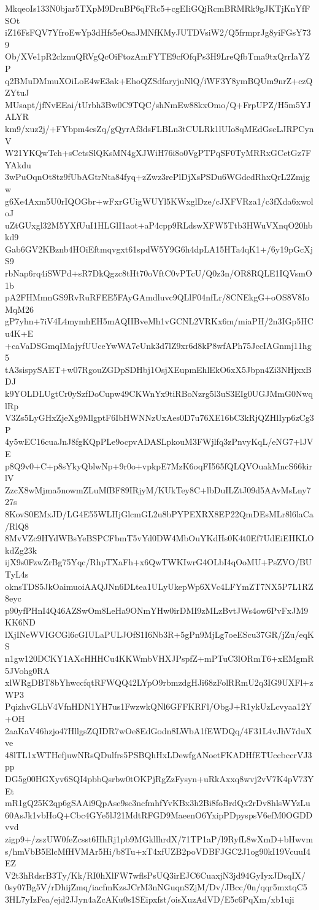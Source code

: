 MkqeoIs133N0bjar5TXpM9DruBP6qFRc5+cgEIiGQjRcmBRMRk9gJKTjKnYfFSOt
iZ16FsFQV7YfroEwYp3dHfs5eOsaJMNfKMyJUTDVsiW2/Q5frmprJg8yiFGsY739
Ob/XVe1pR2clznuQRVgQcOiFtozAmFYTE9cfOfqPs3H9LreQfbTma9txQrrIaYZP
q2BMuDMmuXOiLoE4wE3ak+EhoQZSdfaryjuNlQ/iWF3Y8ymBQUm9nrZ+czQZYtuJ
MUsapt/jfNvEEai/tUrbh3Bw0C9TQC/shNmEw88kxOmo/Q+FrpUPZ/H5m5YJALYR
km9/xuz2j/+FYbpm4csZq/gQyrAf3dsFLBLn3tCULRk1lUIo8qMEdGscLJRPCynV
W21YKQwTch+sCetsSlQKsMN4gXJWiH76i8o0VgPTPqSF0TyMRRxGCetGz7FYAkdu
3wPuOqnOt8tz9fUbAGtrNta84fyq+zZwz3rePlDjXsPSDu6WGdedRhxQrL2Zmjgw
g6Xe4Axm5U0rIQOGbr+wFxrGUigWUYl5KWxglDze/cJXFVRza1/c3fXda6xwoloJ
uZtGUxgl32M5YXfUuI1HLGlI1aot+aP4cpp9RLdswXFW5Ttb3HWuVXnqO20hbkd9
Gab6GV2KBznb4HOiEftmqvgxt61spdW5Y9G6h4dpLA15HTa4qK1+/6y19pGcXjS9
rbNap6rq4iSWPd+sR7DkQgzc8tHt70oVftC0vPTcU/Q0z3n/OR8RQLE1IQVsmO1b
pA2FHMmnGS9RvRuRFEE5FAyGAmdluvc9QLlF04nfLr/8CNEkgG+oOS8V8IoMqM26
gP7yhn+7iV4L4mymhEH5mAQIIBveMh1vGCNL2VRKx6m/miaPH/2n3IGp5HCu4K+E
+caVaDSGmqIMajyfUUceYwWA7eUnk3d7lZ9xr6d8kP8wfAPh75JccIAGnmj11hg5
tA3sispySAET+w07RgouZGDpSDHbj1OsjXEupmEhlEkO6xX5Jbpn4Zi3NHjxxBDJ
k9YOLDLUgtCr0ySzfDoCupw49CKWnYx9tiRBoNzrg5l3uS3EIg0UGJMmG0NwqlRp
V3Zs5LyGHxZjeXg9MlgptF6IbHWNNzUxAes0D7u76XE16bC3kRjQZHlIyp6zCg3P
4y5wEC16cuaJnJ8fgKQpPLe9ocpvADASLpkouM3FWjlfq3zPnvyKqL/eNG7+lJVE
p8Q9v0+C+p8sYkyQblwNp+9r0o+vpkpE7MzK6oqFI565fQLQVOuakMncS66kirlV
ZzcX8wMjma5nowmZLuMfBF89IRjyM/KUkTey8C+lbDuILZtJ09d5AAvMsLny727s
8KovS0EMxJD/LG4E55WLHjGlcmGL2u8bPYPEXRX8EP22QmDEsMLr8l6laCa/RlQ8
8MvVZc9HYdWBsYeBSPCFbmT5vYd0DW4MbOuYKdHs0K4t0Ef7UdEiEHKLOkdZg23k
ijX9s0FzwZrBg75Yqc/RhpTXaFh+x6QwTWKIwrG4OLbI4qOoMU+PsZVO/BUTyL4s
oknsTDS5JkOaimuoiAAQJNn6DLtea1ULyUkepWp6XVc4LFYmZT7NX5P7L1RZ8eyc
p90yfPHnI4Q46AZSwOm8LeHa9ONmYHw0irDMI9zMLzBvtJWs4ow6PvFxJM9KK6ND
lXjINeWVIGCGl6cGIULaPULJOfS1I6Nb3R+5gPn9MjLg7oeEScu37GR/jZu/eqKS
n1gw120DCKY1AXcHHHCu4KKWmbVHXJPspfZ+mPTuC3lORmT6+xEMgmR5JVohg0RA
xlWRgDBT8bYhwccfqtRFWQQ42LYpO9rbmzdgHJi68zFolRRmU2q3IG9UXFl+zWP3
PqizhvGLhV4VfnHDN1YH7us1FwzwkQNl6GFFKRFl/ObgJ+R1ykUzLcvyaa12Y+OH
2aaKaV46hzjo47HllgsZQIDR7wOe8EdGodn8LWbA1fEWDQq/4F31L4vJhV7duXve
48lTL1xWTHefjuwNRsQDulfrs5PSBQhHxLDewfgANoetFKADHfETUccbccrVJ3pp
DG5g00HGXyv6SQI4pbbQsrbw0tOKPjRgZzFysyn+uRkAxxq8wvj2vV7K4pV73YEt
mR1gQ25K2qp6gSAAi9QpAse9sc3ncfmhfYvKBx3h2Bi8foBrdQx2rDv8hlsWYzLu
60AsJk1vbHoQ+Cbc4GYe5lJ21MdtRFGD9MaeenO6YxipPDpyspsV6efM0OGDDvvd
zigp9+/zszUW0feZcsst6HhRj1pb9MGkllhrdX/71TP1aP/l9RyfL8wXmD+bHwvm
s/hmVbB5ElcMfHVMAr5Hi/b8Tu+xT4xfUZB2poVDBFJGC2J1og90kI19VcuuI4EZ
V2t3hRdsrB3Ty/Kk/RI0hXlFW7wflsPsUQ3irEJC6CuaxjN3jd94GyIyxJDsqIX/
0sy07Bg5V/rDhijZmq/iacfmKzsJCrM3nNGuqnSZjM/Dv/JBcc/0n/qqr5mxtqC5
3HL7yIzFea/ejd2JJyn4aZcAKu0s1SEipxfst/oisXuzAdVD/E5c6PqXm/xb1uji
